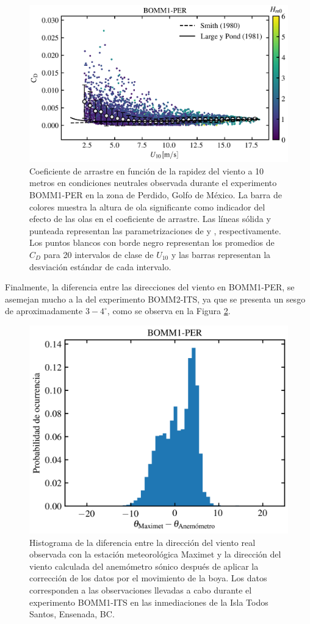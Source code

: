 \documentclass[11pt]{article}
\begin{document}
\begin{figure}[htpb]
  \centering
  \includegraphics[width=0.68\linewidth]{../figures/bomm1_per_drag_coefficient.png}
  \caption{
    Coeficiente de arrastre en función de la rapidez del viento a 10 metros en
    condiciones neutrales observada durante el experimento BOMM1-PER en la zona
    de Perdido, Golfo de México.  La barra de colores muestra la altura de ola
    significante como indicador del efecto de las olas en el coeficiente de
    arrastre. Las líneas sólida y punteada representan las parametrizaciones de
    \citet{Smith1980} y \citet{LargePond1981}, respectivamente. Los puntos
    blancos con borde negro representan los promedios de $C_D$ para 20
    intervalos de clase de $U_{10}$ y las barras representan la desviación
    estándar de cada intervalo.
  }
  \label{fig:bomm1_per_drag_coefficient}
\end{figure}

Finalmente, la diferencia entre las direcciones del viento en BOMM1-PER, se
asemejan mucho a la del experimento BOMM2-ITS, ya que se presenta un sesgo de
aproximadamente $3-4^\circ{}$, como se observa en la Figura
\ref{fig:bomm1_per_wind_direction_histogram}.

\begin{figure}[t]
  \centering
  \includegraphics[width=0.5\linewidth]{../figures/bomm1_per_wind_direction_histogram.png}
  \caption{
    Histograma de la diferencia entre la dirección del viento real observada con
    la estación meteorológica Maximet y la dirección del viento calculada del
    anemómetro sónico después de aplicar la corrección de los datos por el
    movimiento de la boya. Los datos corresponden a las observaciones llevadas a
    cabo durante el experimento BOMM1-ITS en las inmediaciones de la Isla Todos
    Santos, Ensenada, BC.
  }
  \label{fig:bomm1_per_wind_direction_histogram}
\end{figure}
\end{document}
